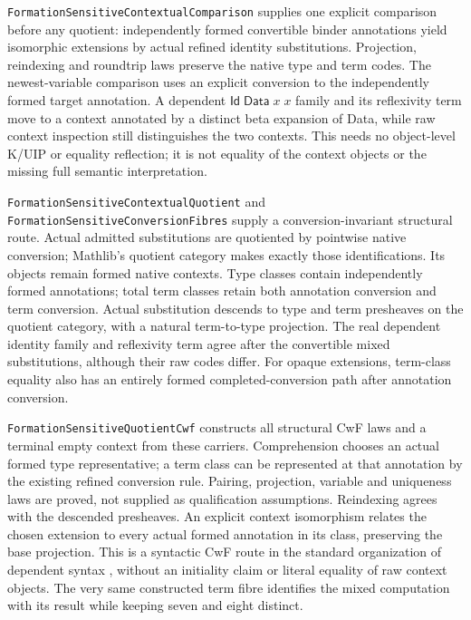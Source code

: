 \documentclass[11pt]{article}
\theoremstyle{definition}
\theoremstyle{remark}
\begin{document}
\nolinkurl{FormationSensitiveContextualComparison} supplies one explicit
comparison before any quotient: independently formed convertible binder
annotations yield isomorphic extensions by actual refined identity
substitutions. Projection, reindexing and roundtrip laws preserve the native
type and term codes. The newest-variable comparison uses an explicit
conversion to the independently formed target annotation. A dependent
$\mathsf{Id}\;\mathsf{Data}\;x\;x$ family and its reflexivity term move to a
context annotated by a distinct beta expansion of Data, while raw context
inspection still distinguishes the two contexts. This needs no object-level
K/UIP or equality reflection; it is not equality of the context objects or
the missing full semantic interpretation.

\nolinkurl{FormationSensitiveContextualQuotient} and
\nolinkurl{FormationSensitiveConversionFibres} supply a conversion-invariant
structural route. Actual admitted substitutions are quotiented by pointwise
native conversion; Mathlib's quotient category makes exactly those
identifications. Its objects remain formed native contexts. Type classes
contain independently formed annotations; total term classes retain both
annotation conversion and term conversion. Actual substitution descends
to type and term presheaves on the quotient category, with a natural
term-to-type projection. The real dependent identity family and reflexivity
term agree after the convertible mixed substitutions, although their raw
codes differ. For opaque extensions, term-class equality also has an
entirely formed completed-conversion path after annotation conversion.

\nolinkurl{FormationSensitiveQuotientCwf} constructs all structural CwF
laws and a terminal empty context from these carriers. Comprehension
chooses an actual formed type representative; a term class can be represented
at that annotation by the existing refined conversion rule. Pairing,
projection, variable and uniqueness laws are proved, not supplied as
qualification assumptions. Reindexing agrees with the descended presheaves.
An explicit context isomorphism relates the chosen extension to every
actual formed annotation in its class, preserving the base projection.
This is a syntactic CwF route in the standard organization of dependent
syntax \cite{CastellanClairambaultDybjerCwfs}, without an initiality claim or
literal equality of raw context objects. The very same constructed term
fibre identifies the mixed computation with its result while keeping seven
and eight distinct.
\end{document}
